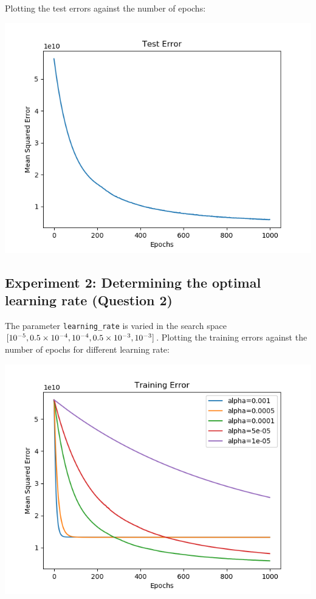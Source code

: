 Plotting the test errors against the number of epochs:

\begin{center}
    \includegraphics[width=\imgw]{images/p1b1_sample_test.png}   
\end{center}

\subsection*{Experiment 2: Determining the optimal learning rate
(Question 2)}

The parameter \texttt{learning\_rate} is varied in the search space
\([10^{-5},0.5\times10^{-4},10^{-4},0.5\times10^{-3},\\10^{-3}]\).
Plotting the training errors against the number of epochs for different
learning rate:

\begin{center}
    \includegraphics[width=\imgw]{images/p1b2_alpha_train.png}   
\end{center}

